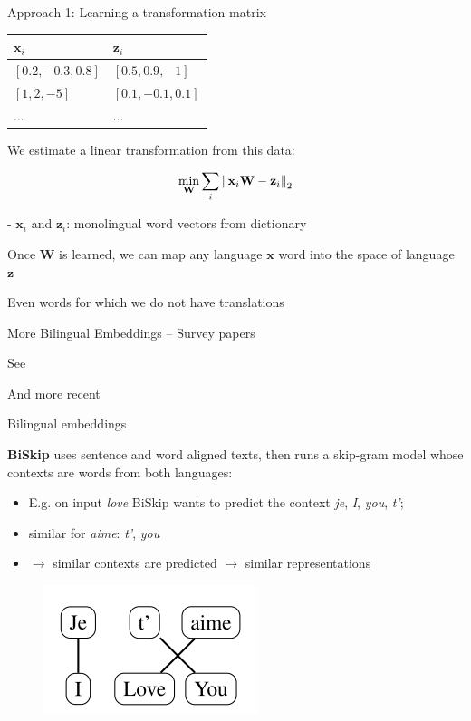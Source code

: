 \documentclass[12pt]{beamer}
\begin{document}
\begin{frame}{Approach 1: Learning a transformation matrix}
	
	\begin{table}
		\begin{tabular}{l|l}
			$\mathbf{x}_i$ & $\mathbf{z}_i$ \\ \hline
			$[0.2,-0.3,0.8]$ & $[0.5,0.9,-1]$ \\ \hline
			$[1,2,-5]$ & $[0.1,-0.1,0.1]$ \\ \hline
			... & ... \\
		\end{tabular}
	\end{table}
	
We estimate a linear transformation from this data:

$$
\min_{\mathbf{W}} \sum_i \norm{\mathbf{x}_i \mathbf{W} - \mathbf{z}_i}_2
$$

- $\mathbf{x}_i$ and $\mathbf{z}_i$: monolingual word vectors from dictionary

Once $ \mathbf{W}$ is learned, we can map any language $\mathbf{x}$ word into the space of
language $\mathbf{z}$

Even words for which we do not have translations
	
\end{frame}

\begin{frame}{More Bilingual Embeddings -- Survey papers}

See 

And more recent 


\end{frame}

\begin{frame}{Bilingual embeddings}
	
\textbf{BiSkip} uses sentence and word aligned texts, then runs a skip-gram model
whose contexts are words from both languages:

\begin{itemize}
	\item E.g. on input \emph{love} BiSkip wants to predict the context \emph{je}, \emph{I}, \emph{you}, \emph{t’};
	\item similar for \emph{aime}: \emph{t’}, \emph{you}
	\item $\to$ similar contexts are predicted $\to$ similar representations
\end{itemize}
	
\begin{figure}
	\includegraphics[width=0.3\linewidth]{img/biskip.png}
\end{figure}
\end{frame}
\end{document}
